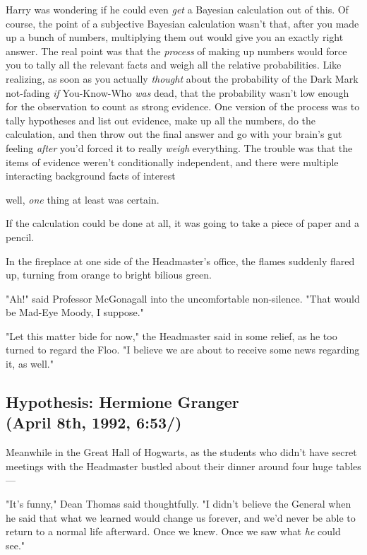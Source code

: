 Harry was wondering if he could even \emph{get} a Bayesian calculation out of
this. Of course, the point of a subjective Bayesian calculation wasn't that,
after you made up a bunch of numbers, multiplying them out would give you an
exactly right answer. The real point was that the \emph{process} of making up
numbers would force you to tally all the relevant facts and weigh all the
relative probabilities. Like realizing, as soon as you actually \emph{thought}
about the probability of the Dark Mark not-fading \emph{if} You-Know-Who
\emph{was} dead, that the probability wasn't low enough for the observation to
count as strong evidence. One version of the process was to tally hypotheses
and list out evidence, make up all the numbers, do the calculation, and then
throw out the final answer and go with your brain's gut feeling \emph{after}
you'd forced it to really \emph{weigh} everything. The trouble was that the
items of evidence weren't conditionally independent, and there were multiple
interacting background facts of interest{\el}

{\el} well, \emph{one} thing at least was certain.

If the calculation could be done at all, it was going to take a piece of paper
and a pencil.

In the fireplace at one side of the Headmaster's office, the flames suddenly
flared up, turning from orange to bright bilious green.

"Ah!" said Professor McGonagall into the uncomfortable non-silence. "That would
be Mad-Eye Moody, I suppose."

"Let this matter bide for now," the Headmaster said in some relief, as he too
turned to regard the Floo. "I believe we are about to receive some news
regarding it, as well."
\sbreak
\vspace{-2\baselineskip}
\subsection{Hypothesis: Hermione Granger\\
(April 8th, 1992, 6:53\PM/)}

Meanwhile in the Great Hall of Hogwarts, as the students who didn't have secret
meetings with the Headmaster bustled about their dinner around four huge
tables---

"It's funny," Dean Thomas said thoughtfully. "I didn't believe the General when
he said that what we learned would change us forever, and we'd never be able to
return to a normal life afterward. Once we knew. Once we saw what \emph{he}
could see."

